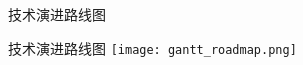 \documentclass{beamer}
\begin{document}
\begin{frame}{技术演进路线图}
    \begin{block}{技术演进路线图}
        \centering
        \texttt{[image: gantt\_roadmap.png]}
    \end{block}
\end{frame}
\end{document}
